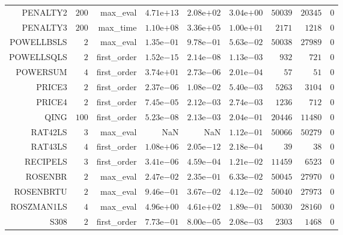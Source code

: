 \begin{longtable}{rrrrrrrrr}
PENALTY2 & \(   200\) & max\_eval & \( 4.71\)e\(+13\) & \( 2.08\)e\(+02\) & \( 3.04\)e\(+00\) & \( 50039\) & \( 20345\) & \(     0\) \\
PENALTY3 & \(   200\) & max\_time & \( 1.10\)e\(+08\) & \( 3.36\)e\(+05\) & \( 1.00\)e\(+01\) & \(  2171\) & \(  1218\) & \(     0\) \\
POWELLBSLS & \(     2\) & max\_eval & \( 1.35\)e\(-01\) & \( 9.78\)e\(-01\) & \( 5.63\)e\(-02\) & \( 50038\) & \( 27989\) & \(     0\) \\
POWELLSQLS & \(     2\) & first\_order & \( 1.52\)e\(-15\) & \( 2.14\)e\(-08\) & \( 1.13\)e\(-03\) & \(   932\) & \(   721\) & \(     0\) \\
POWERSUM & \(     4\) & first\_order & \( 3.74\)e\(+01\) & \( 2.73\)e\(-06\) & \( 2.01\)e\(-04\) & \(    57\) & \(    51\) & \(     0\) \\
PRICE3 & \(     2\) & first\_order & \( 2.37\)e\(-06\) & \( 1.08\)e\(-02\) & \( 5.40\)e\(-03\) & \(  5263\) & \(  3104\) & \(     0\) \\
PRICE4 & \(     2\) & first\_order & \( 7.45\)e\(-05\) & \( 2.12\)e\(-03\) & \( 2.74\)e\(-03\) & \(  1236\) & \(   712\) & \(     0\) \\
QING & \(   100\) & first\_order & \( 5.23\)e\(-08\) & \( 2.13\)e\(-03\) & \( 2.04\)e\(-01\) & \( 20446\) & \( 11480\) & \(     0\) \\
RAT42LS & \(     3\) & max\_eval &       NaN &       NaN & \( 1.12\)e\(-01\) & \( 50066\) & \( 50279\) & \(     0\) \\
RAT43LS & \(     4\) & first\_order & \( 1.08\)e\(+06\) & \( 2.05\)e\(-12\) & \( 2.18\)e\(-04\) & \(    39\) & \(    38\) & \(     0\) \\
RECIPELS & \(     3\) & first\_order & \( 3.41\)e\(-06\) & \( 4.59\)e\(-04\) & \( 1.21\)e\(-02\) & \( 11459\) & \(  6523\) & \(     0\) \\
ROSENBR & \(     2\) & max\_eval & \( 2.47\)e\(-02\) & \( 2.35\)e\(-01\) & \( 6.33\)e\(-02\) & \( 50045\) & \( 27970\) & \(     0\) \\
ROSENBRTU & \(     2\) & max\_eval & \( 9.46\)e\(-01\) & \( 3.67\)e\(-02\) & \( 4.12\)e\(-02\) & \( 50040\) & \( 27973\) & \(     0\) \\
ROSZMAN1LS & \(     4\) & max\_eval & \( 4.96\)e\(+00\) & \( 4.61\)e\(+02\) & \( 1.89\)e\(-01\) & \( 50030\) & \( 28160\) & \(     0\) \\
S308 & \(     2\) & first\_order & \( 7.73\)e\(-01\) & \( 8.00\)e\(-05\) & \( 2.08\)e\(-03\) & \(  2303\) & \(  1468\) & \(     0\) \\

\end{longtable}
